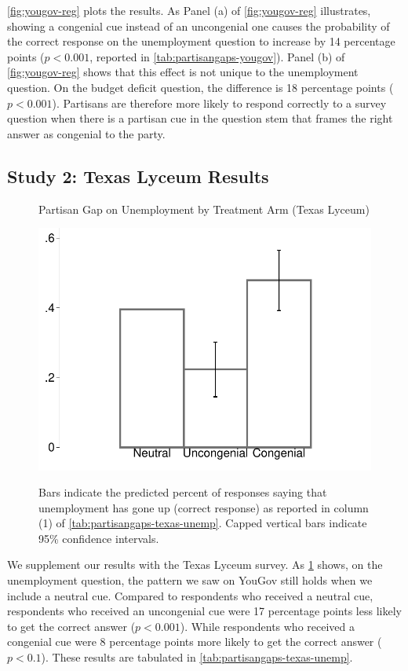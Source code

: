 \documentclass[12pt, letterpaper]{article}
\begin{document}
\cref{fig:yougov-reg} plots the results. As Panel (a) of \cref{fig:yougov-reg} illustrates, showing a congenial cue instead of an uncongenial one causes the probability of the correct response on the unemployment question to increase by 14 percentage points ($p < 0.001$, reported in \cref{tab:partisangaps-yougov}). Panel (b) of \cref{fig:yougov-reg} shows that this effect is not unique to the unemployment question. On the budget deficit question, the difference is 18 percentage points ($p<0.001$). Partisans are therefore more likely to respond correctly to a survey question when there is a partisan cue in the question stem that frames the right answer as congenial to the party.

\subsection*{Study 2: Texas Lyceum Results}\label{subsec:txlyceum_results}

\begin{figure}[!t]
    \centering
    \caption{Partisan Gap on Unemployment by Treatment Arm (Texas Lyceum)}
    \includegraphics[width=.55\textwidth]{../figs/texas-unemp-congenialcue.pdf}
    \label{fig:partisangaps-texas-unemp}
    \caption*{\footnotesize 
        Bars indicate the predicted percent of responses saying that unemployment has gone up (correct response) as reported in column (1) of \cref{tab:partisangaps-texas-unemp}.  
        Capped vertical bars indicate 95\% confidence intervals.
    }
\end{figure}

We supplement our results with the Texas Lyceum survey. As \cref{fig:partisangaps-texas-unemp} shows, on the unemployment question, the pattern we saw on YouGov still holds when we include a neutral cue. Compared to respondents who received a neutral cue, respondents who received an uncongenial cue were 17 percentage points less likely to get the correct answer ($p<0.001$). While respondents who received a congenial cue were 8 percentage points more likely to get the correct answer ($p<0.1$). These results are tabulated in \cref{tab:partisangaps-texas-unemp}.
\end{document}
